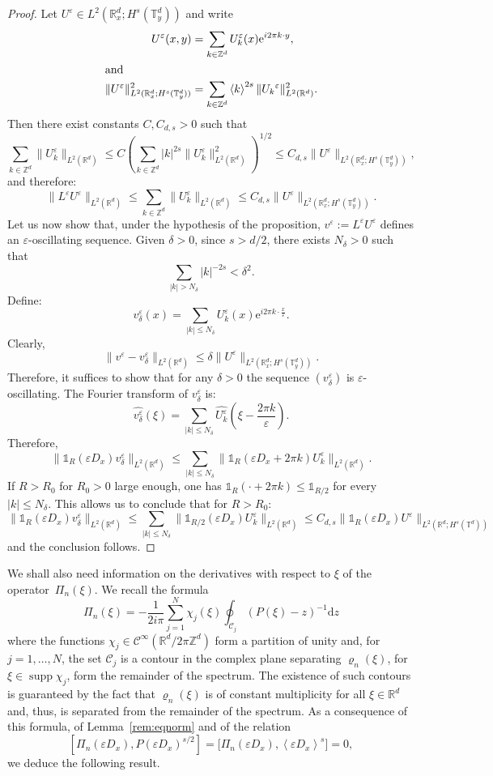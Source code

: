 \documentclass[10pt]{amsart}
\theoremstyle{definition}
\DeclareMathOperator{\supp}{supp}
\newcommand*\R{{\mathbb R}}
\newcommand*\Z{{\mathbb Z}}
\newcommand*\T{{\mathbb T}}
\newcommand*\eps{\varepsilon}
\numberwithin{equation}{section}
\newcommand{\ee}{{\mathrm e}}
\newcommand*{\dd}{\mathrm{d}}
\begin{document}
\begin{proof}
Let $U^\eps \in L^2(\R^d_x;H^s(\T^d_y))$ and write
\begin{align*}
U^\eps(x,y)&=\sum_{k\in\Z^d}U_k^\eps(x){\ee}^{i2\pi k\cdot y},\\
\intertext{and}
\|U{^\eps}\|_{L^2(\R^d_x;H^s(\T^d_y))}^2 &=\sum_{k\in\Z^d}\left\langle k \right\rangle^{{2s}} \|U_k{^\eps}\|^2_{L^2(\R^d)}.
\end{align*}
Then there exist constants $C,C_{d,s}>0$ such that
\[
\sum_{k\in\Z^d}\|U_k^\eps\|_{L^2(\R^d)}\leq C\left(\sum_{k\in\Z^d}|k|^{2s} \|U_k^\eps\|_{L^2(\R^d)}^2\right)^{1/2} \leq C_{d,s} \|U^\eps\|_{L^2(\R^d_x;H^s(\T^d_y))},
\]
and therefore:
\begin{equation}\label{eq:bdVe}
\|L^\eps U^\eps\|_{L^2(\R^d)}\leq \sum_{k\in\Z^d}\|U_k^\eps\|_{L^2(\R^d)}\leq C_{d,s}\|U^\eps\|_{L^2(\R^d_x;H^s(\T^d_y))}.
\end{equation}
Let us now show that, under the hypothesis of the proposition, $v^\eps:=L^\eps U^\eps$ defines an $\eps$-oscillating sequence. Given $\delta>0$, since $s>d/2$, there exists $N_\delta>0$ such that
\[
\sum_{|k|>N_\delta}|k|^{-2s}<\delta^2.
\]
Define:
\[
v^\eps_\delta(x)=\sum_{|k|\leq N_\delta}U_k^\eps(x){\ee}^{i2\pi k\cdot \frac{x}{\eps}}.
\]
Clearly,
\[
\|v^\eps-v^\eps_\delta\|_{L^2(\R^d)}\leq \delta \|U^\eps\|_{L^2(\R^d_x;H^s(\T^d_y))}.
\]
Therefore, it suffices to show that for any $\delta>0$ the sequence $(v^\eps_\delta)$ is $\eps$-oscillating. The Fourier transform of $v^\eps_\delta$ is:
\[
\widehat{v^\eps_\delta}(\xi)=\sum_{|k|\leq N_\delta}\widehat{U_k^\eps}\left(\xi -\frac{2\pi k}{\eps}\right).
\]
Therefore,
\[
\|\mathds{1}_R(\eps D_x)v^\eps_{\delta}\|_{L^2(\R^d)}\leq \sum_{|k|\leq N_\delta}\|\mathds{1}_R(\eps D_x+2\pi k)U_k^\eps\|_{L^2(\R^d)}.
\]
If $R>R_0$ for $R_0>0$ large enough, one has $\mathds{1}_R(\cdot+2\pi k)\leq \mathds{1}_{R/2}$ for every $|k|\leq N_{\delta}$. This allows us to conclude that for $R>R_0$:
\[
\|\mathds{1}_R(\eps D_x)v^\eps_\delta\|_{L^2(\R^d)}\leq \sum_{|k|\leq N_\delta}\|\mathds{1}_{R/2}(\eps D_x)U_k^\eps\|_{L^2(\R^d)}\leq C_{d,s}\|\mathds{1}_R(\eps D_x)U^\eps\|_{L^2(\R^d;H^s(\T^d))}
\]
and the conclusion follows.
\end{proof}



We shall also need information on the derivatives with respect to $\xi$ of the operator~$\Pi_n(\xi)$. We recall the formula
\[
\Pi_n(\xi) =- \frac{1}{2i\pi} \sum_{j=1}^N\chi_j(\xi)\oint_{\mathcal C_j} (P(\xi)-z)^{-1} \dd z
\]
where the functions $\chi_j\in\mathcal{C}^\infty(\R^d/2\pi\Z^d)$ form a partition of unity and, for $j=1,\dots,N$, the set ${\mathcal C_j}$ is a contour in the complex plane separating $\varrho_n(\xi)$, for $\xi\in{\supp}\chi_j$, form the remainder of the spectrum. The existence of such contours is guaranteed by the fact that $\varrho_n(\xi)$ is of constant multiplicity for all $\xi\in\R^d$ and, thus, is separated from the remainder of the spectrum. As a consequence of this formula, of Lemma~\ref{rem:eqnorm} and of the relation
\[
\left[\Pi_n(\eps D_x),P(\eps D_x)^{s/2}\right]=\big[\Pi_n(\eps D_x),\left\langle \eps D_x\right\rangle^s\big]=0,
\]
we deduce the following result.
\end{document}
